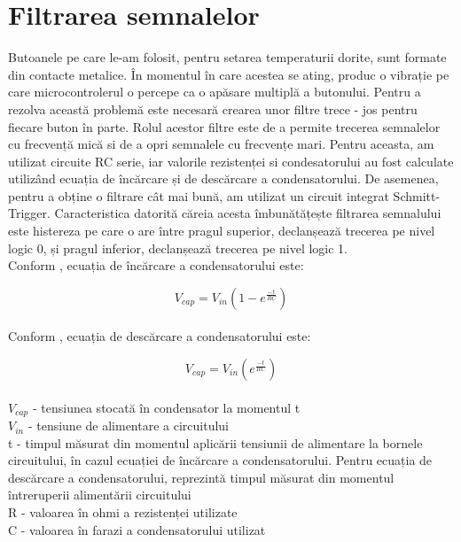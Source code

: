 \section{Filtrarea semnalelor}

	Butoanele pe care le-am folosit, pentru setarea temperaturii dorite, sunt formate din contacte metalice. În momentul în care acestea se ating, produc o vibrație pe care microcontrolerul o percepe ca o apăsare multiplă a butonului. Pentru a rezolva această problemă este necesară crearea unor filtre trece - jos \cite{buttonDebouncing} pentru fiecare buton în parte. Rolul acestor filtre este de a permite trecerea semnalelor cu frecvență mică si de a opri semnalele cu frecvențe mari. Pentru aceasta, am utilizat circuite RC serie, iar valorile rezistenței si condesatorului au fost calculate utilizând ecuația de încărcare și de descărcare a condensatorului. De asemenea, pentru a obține o filtrare cât mai bună, am utilizat un circuit integrat Schmitt-Trigger. Caracteristica datorită căreia acesta îmbunătățește filtrarea semnalului este histereza pe care o are între pragul superior, declanșează trecerea pe nivel logic 0, și pragul inferior, declanșează trecerea pe nivel logic 1.  
\vspace{1em}\\
Conform \cite{buttonDebouncing}, ecuația de încărcare a condensatorului este:

\begin{equation}
V_{cap} = V_{in}(1-e^{\frac{-t}{RC}})
\end{equation}
\vspace{1em}\\
Conform \cite{buttonDebouncing}, ecuația de descărcare a condensatorului este:

\begin{equation}
V_{cap} = V_{in}(e^{\frac{-t}{RC}})                 
\end{equation}
\vspace{1em}\\
$V_{cap}$ - tensiunea stocată în condensator la momentul t
\vspace{0.7em}\\
$V_{in}$ - tensiune de alimentare a circuitului
\vspace{0.7em}\\
t - timpul măsurat din momentul aplicării tensiunii de alimentare la bornele circuitului, în cazul ecuației de încărcare a condensatorului. Pentru ecuația de descărcare a condensatorului, reprezintă timpul măsurat din momentul întreruperii alimentării circuitului
\vspace{0.7em}\\
R - valoarea în ohmi a rezistenței utilizate
\vspace{0.7em}\\
C - valoarea în farazi a condensatorului utilizat\\ 


